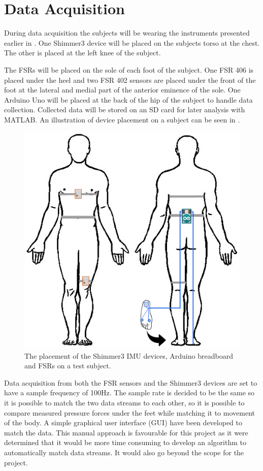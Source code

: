 \section{Data Acquisition}

During data acquisition the subjects will be wearing the instruments presented earlier in . One Shimmer3 device will be placed on the subjects torso at the chest. The other is placed at the left knee of the subject. 

The FSRs will be placed on the sole of each foot of the subject. One FSR 406 is placed under the heel and two FSR 402 sensors are placed under the front of the foot at the lateral and medial part of the anterior eminence of the sole. One Arduino Uno will be placed at the back of the hip of the subject to handle data collection. Collected data will be stored on an SD card for later analysis with MATLAB. An illustration of device placement on a subject can be seen in . 


\begin{figure}[H]
	\includegraphics[width=.6\textwidth]{figures/bodySysSetup}
	\caption{The placement of the Shimmer3 IMU devices, Arduino breadboard and FSRs on a test subject.}
	\label{fig:bodySysSetup}  %
\end{figure}

Data acquisition from both the FSR sensors and the Shimmer3 devices are set to have a sample frequency of 100Hz. The sample rate is decided to be the same so it is possible to match the two data streams to each other, so it is possible to compare measured pressure forces under the feet while matching it to movement of the body. A simple graphical user interface (GUI) have been developed to match the data. This manual approach is favourable for this project as it were determined that it would be more time consuming to develop an algorithm to automatically match data streams. It would also go beyond the scope for the project.


